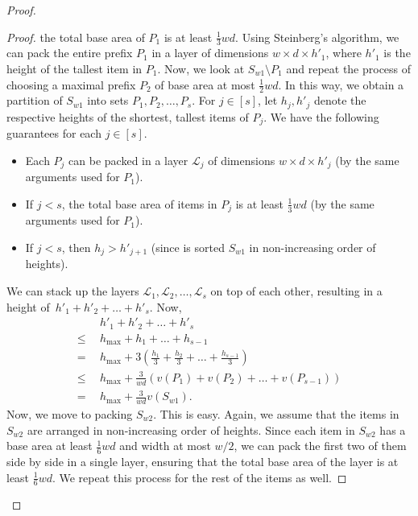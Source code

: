 \begin{proof}
\begin{proof}
    the total base area of $P_1$ is at least $\frac13wd$. Using Steinberg's algorithm, we can pack the entire prefix $P_1$
    in a layer of dimensions $w\times d\times h'_1$, where $h'_1$ is the height of the tallest item in $P_1$. Now, we look at $S_{w1}\setminus P_1$ and repeat the process of choosing a maximal prefix $P_2$ of base area at most $\frac12wd$. In this way, we obtain a partition of
    $S_{w1}$ into sets $P_1,P_2,\dots,P_s$. For $j\in[s]$, let $h_j,h'_j$ denote the respective heights of the shortest, tallest items of $P_j$. We have the following guarantees for each $j\in[s]$.
    \begin{itemize}
        \item Each $P_j$ can be packed in a layer $\mathcal L_j$ of dimensions $w\times d\times h'_j$ (by the same arguments used for $P_1$).
        \item If $j<s$, the total base area of items in $P_j$ is at least $\frac13wd$ (by the same arguments used for $P_1$).
        \item If $j<s$, then $h_j>h'_{j+1}$ (since is sorted $S_{w1}$ in non-increasing order of heights).
    \end{itemize}
    We can stack up the layers $\mathcal L_1,\mathcal L_2,\dots,\mathcal L_s$ on top of each other, resulting in a height of~$h'_1+h'_2+\dots+h'_s$. Now,
    \begin{align}
        &h'_1+h'_2+\dots+h'_s\nonumber\\
        \le\:\:& h_{\max}+h_1+\dots+h_{s-1}\nonumber\\
                        =\:\:&  h_{\max}+3\left(\frac{h_1}{3}+\frac{h_2}{3}+\dots+\frac{h_{s-1}}{3}\right)\nonumber\\ 
                        \le\:\:& h_{\max}+\frac{3}{wd}\left(v(P_1)+v(P_2)+\dots+v(P_{s-1})\right)\tag{since each $P_j$, except the last, has a base area of at least $1/3$}\nonumber\\
                        =\:\:& h_{\max}+\frac{3}{wd}v(S_{w1})\label{eq:telescope}.
    \end{align}
    Now, we move to packing $S_{w2}$. This is easy. Again, we assume that the items in $S_{w2}$ are arranged in non-increasing order of heights.
    Since each item in $S_{w2}$ has a base area at least $\frac16wd$ and width at most $w/2$, we can pack the first two of them side by side in a single layer, ensuring that the total base area of the layer is at least $\frac16wd$.  We repeat this process for the rest of the items as well.

\end{proof}
\end{proof}

